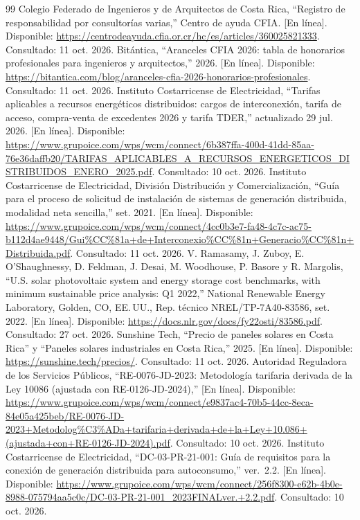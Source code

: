 \documentclass[10pt,letterpaper]{article}
\begin{document}
\begin{thebibliography}{99}
 Colegio Federado de Ingenieros y de Arquitectos de Costa Rica, ``Registro de responsabilidad por consultorías varias,'' Centro de ayuda CFIA. [En línea]. Disponible: \url{https://centrodeayuda.cfia.or.cr/hc/es/articles/360025821333}. Consultado: 11 oct. 2026.
 Bitántica, ``Aranceles CFIA 2026: tabla de honorarios profesionales para ingenieros y arquitectos,'' 2026. [En línea]. Disponible: \url{https://bitantica.com/blog/aranceles-cfia-2026-honorarios-profesionales}. Consultado: 11 oct. 2026.
 Instituto Costarricense de Electricidad, ``Tarifas aplicables a recursos energéticos distribuidos: cargos de interconexión, tarifa de acceso, compra-venta de excedentes 2026 y tarifa TDER,'' actualizado 29 jul. 2026. [En línea]. Disponible: \url{https://www.grupoice.com/wps/wcm/connect/6b387ffa-400d-41dd-85aa-76e36daffb20/TARIFAS_APLICABLES_A_RECURSOS_ENERGETICOS_DISTRIBUIDOS_ENERO_2025.pdf}. Consultado: 10 oct. 2026.
 Instituto Costarricense de Electricidad, División Distribución y Comercialización, ``Guía para el proceso de solicitud de instalación de sistemas de generación distribuida, modalidad neta sencilla,'' set. 2021. [En línea]. Disponible: \url{https://www.grupoice.com/wps/wcm/connect/4cc0b3e7-fa48-4c7c-ac75-b112d4ae9448/Gui%CC%81a+de+Interconexio%CC%81n+Generacio%CC%81n+Distribuida.pdf}. Consultado: 11 oct. 2026.
 V. Ramasamy, J. Zuboy, E. O'Shaughnessy, D. Feldman, J. Desai, M. Woodhouse, P. Basore y R. Margolis, ``U.S. solar photovoltaic system and energy storage cost benchmarks, with minimum sustainable price analysis: Q1 2022,'' National Renewable Energy Laboratory, Golden, CO, EE.\,UU., Rep. técnico NREL/TP-7A40-83586, set. 2022. [En línea]. Disponible: \url{https://docs.nlr.gov/docs/fy22osti/83586.pdf}. Consultado: 27 oct. 2026.
 Sunshine Tech, ``Precio de paneles solares en Costa Rica'' y ``Paneles solares industriales en Costa Rica,'' 2025. [En línea]. Disponible: \url{https://sunshine.tech/precios/}. Consultado: 11 oct. 2026.
 Autoridad Reguladora de los Servicios Públicos, ``RE-0076-JD-2023: Metodología tarifaria derivada de la Ley 10086 (ajustada con RE-0126-JD-2024),'' [En línea]. Disponible: \url{https://www.grupoice.com/wps/wcm/connect/e9837ac4-70b5-44cc-8eca-84e05a425beb/RE-0076-JD-2023+Metodolog%C3%ADa+tarifaria+derivada+de+la+Ley+10.086+(ajustada+con+RE-0126-JD-2024).pdf}. Consultado: 10 oct. 2026.
 Instituto Costarricense de Electricidad, ``DC-03-PR-21-001: Guía de requisitos para la conexión de generación distribuida para autoconsumo,'' ver.\ 2.2. [En línea]. Disponible: \url{https://www.grupoice.com/wps/wcm/connect/256f8300-e62b-4b0e-8988-075794aa5c0c/DC-03-PR-21-001_2023FINALver.+2.2.pdf}. Consultado: 10 oct. 2026.

\end{thebibliography}
\end{document}
